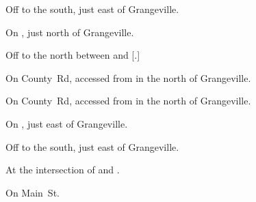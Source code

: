 
\begin{LocationList}

Off  to the south, just east of Grangeville.

On , just north of Grangeville.

Off  to the north between  and [.]

On County~Rd, accessed from  in the north of Grangeville.

On County~Rd, accessed from  in the north of Grangeville.

On , just east of Grangeville.

Off  to the south, just east of Grangeville.

\Location{\TruckStop \Gas \Rest}
At the intersection of  and .

On  Main~St.

\end{LocationList}
